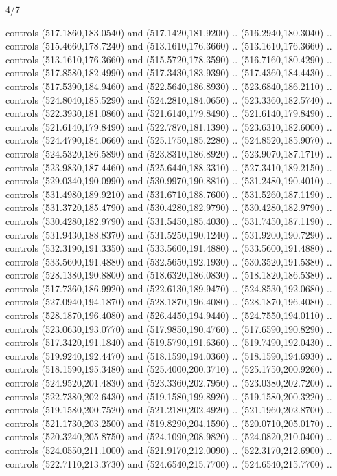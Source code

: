 \begin{flagdescription}{4/7}
\begin{scope}[shift={(0.5\flaglength,0.5\flagwidth)},scale=\flagwidth*\stretchfactor/820]
\begin{scope}[scale=1.87,xshift=-138mm,yshift=75mm]
\begin{scope}[y=0.8pt, x=0.8pt, yscale=-1, xscale=1]
\begin{scope}[fill=cd2a567]
  controls (517.1860,183.0540) and (517.1420,181.9200) .. (516.2940,180.3040) ..
  controls (515.4660,178.7240) and (513.1610,176.3660) .. (513.1610,176.3660) ..
  controls (513.1610,176.3660) and (515.5720,178.3590) .. (516.7160,180.4290) ..
  controls (517.8580,182.4990) and (517.3430,183.9390) .. (517.4360,184.4430) ..
  controls (517.5390,184.9460) and (522.5640,186.8930) .. (523.6840,186.2110) ..
  controls (524.8040,185.5290) and (524.2810,184.0650) .. (523.3360,182.5740) ..
  controls (522.3930,181.0860) and (521.6140,179.8490) .. (521.6140,179.8490) ..
  controls (521.6140,179.8490) and (522.7870,181.1390) .. (523.6310,182.6000) ..
  controls (524.4790,184.0660) and (525.1750,185.2280) .. (524.8520,185.9070) ..
  controls (524.5320,186.5890) and (523.8310,186.8920) .. (523.9070,187.1710) ..
  controls (523.9830,187.4460) and (525.6440,188.3310) .. (527.3410,189.2150) ..
  controls (529.0340,190.0990) and (530.9970,190.8810) .. (531.2480,190.4010) ..
  controls (531.4980,189.9210) and (531.6710,188.7600) .. (531.5260,187.1190) ..
  controls (531.3720,185.4790) and (530.4280,182.9790) .. (530.4280,182.9790) ..
  controls (530.4280,182.9790) and (531.5450,185.4030) .. (531.7450,187.1190) ..
  controls (531.9430,188.8370) and (531.5250,190.1240) .. (531.9200,190.7290) ..
  controls (532.3190,191.3350) and (533.5600,191.4880) .. (533.5600,191.4880) ..
  controls (533.5600,191.4880) and (532.5650,192.1930) .. (530.3520,191.5380) ..
  controls (528.1380,190.8800) and (518.6320,186.0830) .. (518.1820,186.5380) ..
  controls (517.7360,186.9920) and (522.6130,189.9470) .. (524.8530,192.0680) ..
  controls (527.0940,194.1870) and (528.1870,196.4080) .. (528.1870,196.4080) ..
  controls (528.1870,196.4080) and (526.4450,194.9440) .. (524.7550,194.0110) ..
  controls (523.0630,193.0770) and (517.9850,190.4760) .. (517.6590,190.8290) ..
  controls (517.3420,191.1840) and (519.5790,191.6360) .. (519.7490,192.0430) ..
  controls (519.9240,192.4470) and (518.1590,194.0360) .. (518.1590,194.6930) ..
  controls (518.1590,195.3480) and (525.4000,200.3710) .. (525.1750,200.9260) ..
  controls (524.9520,201.4830) and (523.3360,202.7950) .. (523.0380,202.7200) ..
  controls (522.7380,202.6430) and (519.1580,199.8920) .. (519.1580,200.3220) ..
  controls (519.1580,200.7520) and (521.2180,202.4920) .. (521.1960,202.8700) ..
  controls (521.1730,203.2500) and (519.8290,204.1590) .. (520.0710,205.0170) ..
  controls (520.3240,205.8750) and (524.1090,208.9820) .. (524.0820,210.0400) ..
  controls (524.0550,211.1000) and (521.9170,212.0090) .. (522.3170,212.6900) ..
  controls (522.7110,213.3730) and (524.6540,215.7700) .. (524.6540,215.7700) ..

\end{scope}
\end{scope}
\end{scope}
\end{scope}
\end{flagdescription}
